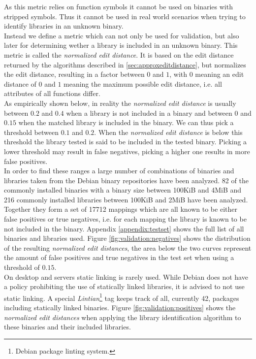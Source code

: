 \documentclass[
    12pt,                               %
    DIV=14,                     %
    parskip=half+,              %
    bigheadings,                %
    cleardoubleempty,   %
    halfparskip,                %
    ]{scrreprt} %
\begin{document}
As this metric relies on function symbols it cannot be used on binaries with stripped symbols. Thus it cannot be used in real world scenarios when trying to identify libraries in an unknown binary. \\
Instead we define a metric which can not only be used for validation, but also later for determining wether a library is included in an unknown binary. This metric is called the \textit{normalized edit distance}. It is based on the edit distance returned by the algorithms described in \ref{sec:approxeditdistance}, but normalizes the edit distance, resulting in a factor between $0$ and $1$, with $0$ meaning an edit distance of $0$ and $1$ meaning the maximum possible edit distance, i.e. all attributes of all functions differ. \\
As empirically shown below, in reality the \textit{normalized edit distance} is usually between $0.2$ and $0.4$ when a library is not included in a binary and between $0$ and $0.15$ when the matched library is included in the binary. We can thus pick a threshold between $0.1$ and $0.2$. When the \textit{normalized edit distance} is below this threshold the library tested is said to be included in the tested binary. Picking a lower threshold may result in false negatives, picking a higher one results in more false positives. \\
In order to find these ranges a large number of combinations of binaries and libraries taken from the Debian binary repositories have been analyzed. 82 of the commonly installed binaries with a binary size between 100KiB and 4MiB and 216 commonly installed libraries between 100KiB and 2MiB have been analyzed. Together they form a set of 17712 mappings which are all known to be either false positives or true negatives, i.e. for each mapping the library is known to be not included in the binary. Appendix \ref{appendix:testset} shows the full list of all binaries and libraries used. Figure \ref{fig:validation:negatives} shows the distribution of the resulting \textit{normalized edit distances}, the area below the two curves represent the amount of false positives and true negatives in the test set when using a threshold of $0.15$. \\
On desktop and servers static linking is rarely used. While Debian does not have a policy prohibiting the use of statically linked libraries, it is advised to not use static linking\cite{debian-static-linking}. A special \textit{Lintian}\footnote{Debian package linting system.} tag keeps track of all, currently 42, packages including statically linked binaries\cite{debian-static-linked-list}. Figure \ref{fig:validation:positives} shows the \textit{normalized edit distances} when applying the library identification algorithm to these binaries and their included libraries.
\end{document}

